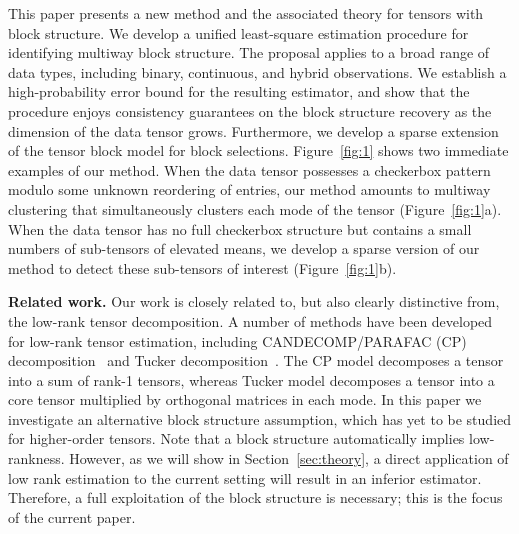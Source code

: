 \documentclass[11pt]{article}
\theoremstyle{plain}
\theoremstyle{definition}
\begin{document}
This paper presents a new method and the associated theory for tensors with block structure. We develop a unified least-square estimation procedure for identifying multiway block structure. The proposal applies to a broad range of data types, including binary, continuous, and hybrid observations. We establish a high-probability error bound for the resulting estimator, and show that the procedure enjoys consistency guarantees on the block structure recovery as the dimension of the data tensor grows. Furthermore, we develop a sparse extension of the tensor block model for block selections. Figure~\ref{fig:1} shows two immediate examples of our method. When the data tensor possesses a checkerbox pattern modulo some unknown reordering of entries, our method amounts to multiway clustering that simultaneously clusters each mode of the tensor (Figure~\ref{fig:1}a). When the data tensor has no full checkerbox structure but contains a small numbers of sub-tensors of elevated means, we develop a sparse version of our method to detect these sub-tensors of interest (Figure~\ref{fig:1}b). 

{\bf Related work.} Our work is closely related to, but also clearly distinctive from, the low-rank tensor decomposition. A number of methods have been developed for low-rank tensor estimation, including CANDECOMP/PARAFAC (CP) decomposition~\cite{hitchcock1927expression} and Tucker decomposition~\cite{tucker1966some}. The CP model decomposes a tensor into a sum of rank-1 tensors, whereas Tucker model decomposes a tensor into a core tensor multiplied by orthogonal matrices in each mode. In this paper we investigate an alternative block structure assumption, which has yet to be studied for higher-order tensors. Note that a block structure automatically implies low-rankness. However, as we will show in Section~\ref{sec:theory}, a direct application of low rank estimation to the current setting will result in an inferior estimator. Therefore, a full exploitation of the block structure is necessary; this is the focus of the current paper. 
\end{document}
